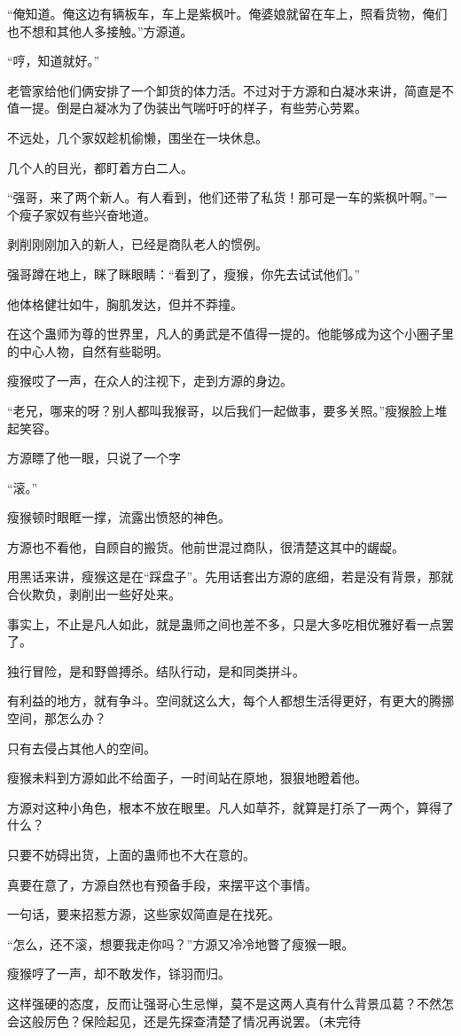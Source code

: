 \begin{this_body}
“俺知道。俺这边有辆板车，车上是紫枫叶。俺婆娘就留在车上，照看货物，俺们也不想和其他人多接触。”方源道。

“哼，知道就好。”

老管家给他们俩安排了一个卸货的体力活。不过对于方源和白凝冰来讲，简直是不值一提。倒是白凝冰为了伪装出气喘吁吁的样子，有些劳心劳累。

不远处，几个家奴趁机偷懒，围坐在一块休息。

几个人的目光，都盯着方白二人。

“强哥，来了两个新人。有人看到，他们还带了私货！那可是一车的紫枫叶啊。”一个瘦子家奴有些兴奋地道。

剥削刚刚加入的新人，已经是商队老人的惯例。

强哥蹲在地上，眯了眯眼睛：“看到了，瘦猴，你先去试试他们。”

他体格健壮如牛，胸肌发达，但并不莽撞。

在这个蛊师为尊的世界里，凡人的勇武是不值得一提的。他能够成为这个小圈子里的中心人物，自然有些聪明。

瘦猴哎了一声，在众人的注视下，走到方源的身边。

“老兄，哪来的呀？别人都叫我猴哥，以后我们一起做事，要多关照。”瘦猴脸上堆起笑容。

方源瞟了他一眼，只说了一个字

“滚。”

瘦猴顿时眼眶一撑，流露出愤怒的神色。

方源也不看他，自顾自的搬货。他前世混过商队，很清楚这其中的龌龊。

用黑话来讲，瘦猴这是在“踩盘子”。先用话套出方源的底细，若是没有背景，那就合伙欺负，剥削出一些好处来。

事实上，不止是凡人如此，就是蛊师之间也差不多，只是大多吃相优雅好看一点罢了。

独行冒险，是和野兽搏杀。结队行动，是和同类拼斗。

有利益的地方，就有争斗。空间就这么大，每个人都想生活得更好，有更大的腾挪空间，那怎么办？

只有去侵占其他人的空间。

瘦猴未料到方源如此不给面子，一时间站在原地，狠狠地瞪着他。

方源对这种小角色，根本不放在眼里。凡人如草芥，就算是打杀了一两个，算得了什么？

只要不妨碍出货，上面的蛊师也不大在意的。

真要在意了，方源自然也有预备手段，来摆平这个事情。

一句话，要来招惹方源，这些家奴简直是在找死。

“怎么，还不滚，想要我走你吗？”方源又冷冷地瞥了瘦猴一眼。

瘦猴哼了一声，却不敢发作，铩羽而归。

这样强硬的态度，反而让强哥心生忌惮，莫不是这两人真有什么背景瓜葛？不然怎会这般厉色？保险起见，还是先探查清楚了情况再说罢。（未完待

\end{this_body}

